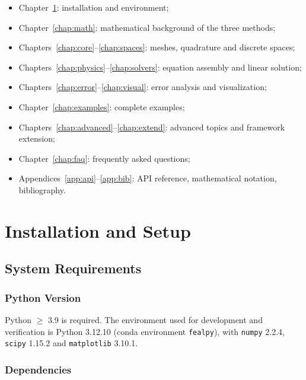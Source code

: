 \documentclass[11pt,oneside]{book}
\theoremstyle{definition}
\theoremstyle{plain}
\newcommand{\code}[1]{\texttt{#1}}
\begin{document}
\begin{itemize}[itemsep=0.2em]
  \item Chapter~\ref{chap:install}: installation and environment;
  \item Chapter~\ref{chap:math}: mathematical background of the three methods;
  \item Chapters~\ref{chap:core}--\ref{chap:spaces}: meshes, quadrature and discrete
        spaces;
  \item Chapters~\ref{chap:physics}--\ref{chap:solvers}: equation assembly and
        linear solution;
  \item Chapters~\ref{chap:error}--\ref{chap:visual}: error analysis and
        visualization;
  \item Chapter~\ref{chap:examples}: complete examples;
  \item Chapters~\ref{chap:advanced}--\ref{chap:extend}: advanced topics and
        framework extension;
  \item Chapter~\ref{chap:faq}: frequently asked questions;
  \item Appendices~\ref{app:api}--\ref{app:bib}: API reference, mathematical
        notation, bibliography.
\end{itemize}

\chapter{Installation and Setup}
\label{chap:install}

\section{System Requirements}

\subsection{Python Version}

Python $\ge$ 3.9 is required. The environment used for development and verification is
Python 3.12.10 (conda environment \code{fealpy}), with \code{numpy} 2.2.4,
\code{scipy} 1.15.2 and \code{matplotlib} 3.10.1.

\subsection{Dependencies}
\end{document}
